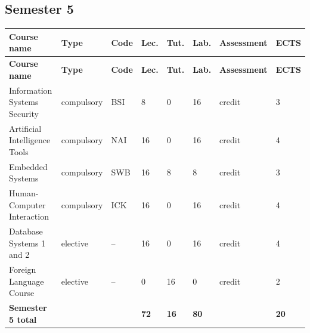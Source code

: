 \documentclass[12pt,a4paper]{article}
\newcommand{\thdrule}{\noalign{\global\setlength{\extrarowheight}{0pt}}}
\newcommand{\thdend}{\noalign{\global\setlength{\extrarowheight}{4pt}}}
\begin{document}
\clearpage
\subsection*{Semester 5}

{\scriptsize
\begin{longtable}{m{5.0cm}m{1.9cm}m{0.75cm}m{0.85cm}m{0.85cm}m{0.85cm}m{1.45cm}m{0.9cm}}
\thdrule\toprule
\rowcolor{pjatkRed}
{\color{white}\footnotesize\textbf{\vphantom{Ag}Course name}} & {\color{white}\footnotesize\textbf{\vphantom{Ag}Type}} & {\color{white}\footnotesize\textbf{\vphantom{Ag}Code}} & {\color{white}\footnotesize\textbf{\vphantom{Ag}Lec.}} & {\color{white}\footnotesize\textbf{\vphantom{Ag}Tut.}} & {\color{white}\footnotesize\textbf{\vphantom{Ag}Lab.}} & {\color{white}\footnotesize\textbf{\vphantom{Ag}Assessment}} & {\color{white}\footnotesize\textbf{\vphantom{Ag}ECTS}} \\
\midrule\thdend
\endfirsthead
\thdrule\toprule
\rowcolor{pjatkRed}
{\color{white}\footnotesize\textbf{\vphantom{Ag}Course name}} & {\color{white}\footnotesize\textbf{\vphantom{Ag}Type}} & {\color{white}\footnotesize\textbf{\vphantom{Ag}Code}} & {\color{white}\footnotesize\textbf{\vphantom{Ag}Lec.}} & {\color{white}\footnotesize\textbf{\vphantom{Ag}Tut.}} & {\color{white}\footnotesize\textbf{\vphantom{Ag}Lab.}} & {\color{white}\footnotesize\textbf{\vphantom{Ag}Assessment}} & {\color{white}\footnotesize\textbf{\vphantom{Ag}ECTS}} \\
\midrule\thdend
\endhead
\rowcolor{tableRowLight} Information Systems Security & {\scriptsize compulsory} & BSI & 8 & 0 & 16 & {\scriptsize credit} & 3 \\
\rowcolor{tableRowAlt} Artificial Intelligence Tools & {\scriptsize compulsory} & NAI & 16 & 0 & 16 & {\scriptsize credit} & 4 \\
\rowcolor{tableRowLight} Embedded Systems & {\scriptsize compulsory} & SWB & 16 & 8 & 8 & {\scriptsize credit} & 3 \\
\rowcolor{tableRowAlt} Human-Computer Interaction & {\scriptsize compulsory} & ICK & 16 & 0 & 16 & {\scriptsize credit} & 4 \\
\rowcolor{tableElective} Database Systems 1 and 2 & {\scriptsize elective} & -- & 16 & 0 & 16 & {\scriptsize credit} & 4 \\
\rowcolor{tableElective} Foreign Language Course & {\scriptsize elective} & -- & 0 & 16 & 0 & {\scriptsize credit} & 2 \\
\midrule[\heavyrulewidth]
\rowcolor{tableSummary} \textbf{Semester 5 total} & & & \textbf{72} & \textbf{16} & \textbf{80} & & \textbf{20} \\
\bottomrule
\end{longtable}}
\end{document}

